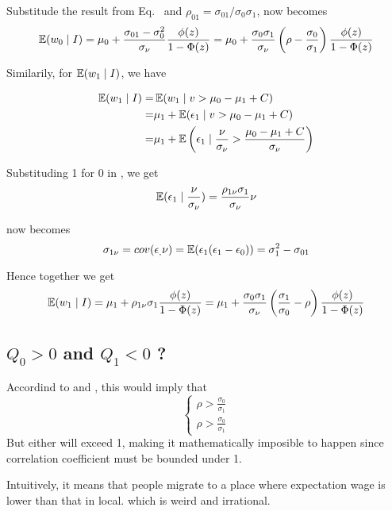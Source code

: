 Substitude the result from Eq.~ and $\rho_{01}=\sigma_{01}/\sigma_0\sigma_1$, 
 now becomes
\begin{equation}
    \label{eq:E_0_I}
    \operatorname{\mathbb{E}}(w_{0} \mid I) = 
    \mu_0 + \frac{\sigma_{01}-\sigma_0^2}{\sigma_\nu} \frac{\phi(z)}{1-\Phi(z)}
    =\mu_0 + \frac{\sigma_0 \sigma_1}{\sigma_\nu}\left(
        \rho - \frac{\sigma_0}{\sigma_1}
    \right)\frac{\phi(z)}{1-\Phi(z)}
\end{equation}

Similarily, for $\operatorname{\mathbb{E}}(w_1 \mid I)$, we have

\begin{align*}
    \operatorname{\mathbb{E}}(w_{1} \mid I) =& \operatorname{\mathbb{E}}(w_{1} \mid v > \mu_0 - \mu_1 + C)  \\
    =& \mu_1 + \operatorname{\mathbb{E}}(\epsilon_1 \mid  v > \mu_0 - \mu_1 + C )  \\
    =& \mu_1 + \operatorname{\mathbb{E}} \left(
            \epsilon_1 \mid \frac{\nu}{\sigma_\nu} > \frac{\mu_0 - \mu_1 + C}{\sigma_\nu}
            \right)
\end{align*}

Substituding 1 for 0 in , we get
\begin{equation}
    \label{eq:biv_normal_exp_1}
    \operatorname{\mathbb{E}}(\epsilon_1 \mid \frac{\nu}{\sigma_\nu})
    =\frac{\rho_{1\nu}\sigma_1}{\sigma_\nu}\nu
\end{equation}

 now becomes
\begin{equation}
    \label{eq:cov_1_nu}
    \sigma_{1\nu}=cov(\epsilon_, \nu)=
    \operatorname{\mathbb{E}}(\epsilon_1 (\epsilon_1 - \epsilon_0)) = \sigma_{1}^2-\sigma_{01}
\end{equation}

Hence together we get
\begin{equation}
    \label{eq:E_1_I}
    \operatorname{\mathbb{E}}(w_{1} \mid I) = 
    \mu_1 + \rho_{1\nu}\sigma_1 \frac{\phi(z)}{1-\Phi(z)}
    =\mu_1 + \frac{\sigma_0 \sigma_1}{\sigma_\nu}\left(
        \frac{\sigma_1}{\sigma_0} - \rho
    \right)\frac{\phi(z)}{1-\Phi(z)}
\end{equation}



\subsection{$Q_0>0$ and $Q_1<0$ ?}

Accordind to  and , this would imply that
$$
\begin{cases}
    \rho>\frac{\sigma_0}{\sigma_1}\\
    \rho>\frac{\sigma_0}{\sigma_1}
\end{cases}
$$
But either will exceed 1, making it mathematically imposible to happen since correlation coefficient must be bounded under 1.

Intuitively, it means that people migrate to a place where expectation wage is lower than that in local.
which is weird and irrational.